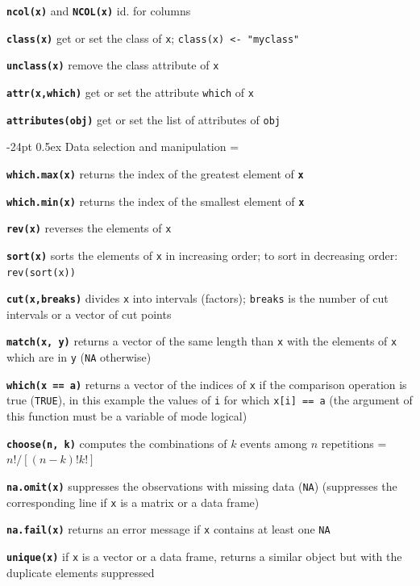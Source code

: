 \documentclass[10pt,landscape]{article}
\makeatletter
\renewcommand\section{\@startsection{section}{1}{0mm}%
                                     {-24pt}%
                                     {0.5ex}%
                                {\color{blue}\normalfont\large\bfseries}}
\newcommand{\code}{\texttt}
\newcommand{\bcode}[1]{\texttt{\textbf{#1}}}
\newcommand\T{\code{TRUE}}
\makeatother
\begin{document}
\begin{multicols*}{3}
\bcode{ncol(x)} and \bcode{NCOL(x)} id. for columns

\bcode{class(x)} get or set the class of \code{x}; \code{class(x) <- "myclass"}

\bcode{unclass(x)} remove the class attribute of \code{x}

\bcode{attr(x,which)} get or set the attribute \code{which} of \code{x}

\bcode{attributes(obj)} get or set the list of attributes of \code{obj}





\section{Data selection and manipulation}
\everypar={\hangindent=9mm}

\bcode{which.max(x)}  returns the index of the greatest element of
\bcode{x}

\bcode{which.min(x)}  returns the index of the smallest element of
\bcode{x}

\bcode{rev(x)}  reverses the elements of \code{x}

\bcode{sort(x)}  sorts the elements of \code{x} in increasing order; to sort in decreasing order: \code{rev(sort(x))}

\bcode{cut(x,breaks)}  divides \code{x} into intervals (factors);
\code{breaks} is the number of cut intervals or a vector of cut points

\bcode{match(x, y)}  returns a vector of the same length than \code{x} with the elements of \code{x} which are in \code{y} (\code{NA} otherwise)

\bcode{which(x == a)}  returns a vector of the indices of \code{x} if the comparison operation is true (\T), in this example the values of \code{i} for which \code{x[i] == a} (the argument of this function must be a variable of mode logical)

\bcode{choose(n, k)}  computes the combinations of $k$ events among $n$ repetitions = $n!/[(n-k)!k!]$

\bcode{na.omit(x)}  suppresses the observations with missing data (\code{NA}) (suppresses the corresponding line if \code{x} is a matrix or a data frame)

\bcode{na.fail(x)}  returns an error message if \code{x} contains at least one \code{NA}

\bcode{unique(x)}  if \code{x} is a vector or a data frame, returns a similar object but with the duplicate elements suppressed


\end{multicols*}
\end{document}
